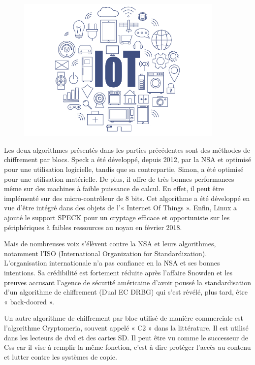 	\begin{figure}[!h]
		\centering
		\includegraphics[width=0.9\textwidth]{imgs/application/IOT.jpg}
		\label{IOT}
	\end{figure}

	Les deux algorithmes présentés dans les parties précédentes sont des méthodes
	de chiffrement par blocs. Speck a été développé, depuis 2012, par la NSA et
	optimisé pour une utilisation logicielle, tandis que sa contrepartie, Simon, a
	été optimisé pour une utilisation matérielle. De plus, il offre de très bonnes
	performances même sur des machines à faible puissance de calcul. En effet, il
	peut être implémenté sur des micro-contrôleur de 8 bits. Cet algorithme a été
	développé en vue d'être intégré dans des objets de l'« Internet Of Things ».
	Enfin, Linux a ajouté le support SPECK pour un cryptage efficace et
	opportuniste sur les périphériques à faibles ressources au noyau en février
	2018.

	Mais de nombreuses voix s'élèvent contre la NSA et leurs algorithmes,
	notamment l'ISO (International Organization for Standardization).
	L'organisation internationale n'a pas confiance en la NSA et ses bonnes
	intentions. Sa crédibilité est fortement réduite après l'affaire Snowden et
	les preuves accusant l'agence de sécurité américaine d'avoir poussé la
	standardisation d'un algorithme de chiffrement (Dual EC DRBG) qui s'est
	révélé, plus tard, être « back-doored »\cite{NSABackdoor}.

	Un autre algorithme de chiffrement par bloc utilisé de manière commerciale est
	l'algorithme Cryptomeria, souvent appelé « C2 » dans la littérature. Il est
	utilisé dans les lecteurs de dvd et des cartes SD. Il peut être vu comme le
	successeur de Css car il vise à remplir la même fonction, c'est-à-dire
	protéger l'accès au contenu et lutter contre les systèmes de copie.
